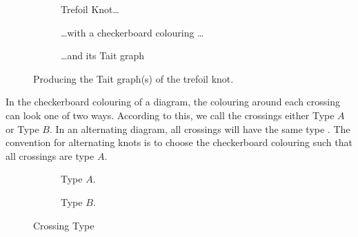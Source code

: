 \documentclass[12pt]{report}
\theoremstyle{upright}
\begin{document}
\begin{figure}[hbt]
	\centering
	\hspace*{\fill}
	\begin{subfigure}[b]{0.3 \textwidth}
		\centering
		\def\svgscale{0.2}
		
		\caption{Trefoil Knot\dots}
		\label{fig:trefoil-blank}
	\end{subfigure}
	\hspace*{\fill}
	\begin{subfigure}[b]{0.3 \textwidth}
		\centering
		\def\svgscale{0.2}
		
		\caption{\dots with a checkerboard colouring \dots}
		\label{fig:trefoil-checker}
	\end{subfigure}
	\hspace*{\fill}
	\begin{subfigure}[b]{0.3 \textwidth}
		\centering
		\def\svgscale{0.2}
		
		\caption{\dots and its Tait graph}
		\label{fig:trefoil-checker-tait}
	\end{subfigure}
	\hspace*{\fill}
	\caption{Producing the Tait graph(s) of the trefoil knot.}
	\label{fig:tait-example}
\end{figure}


In the checkerboard colouring of a diagram, the colouring around each crossing can look one of two ways. According to this, we call the crossings either Type $A$ or Type $B$. In an alternating diagram, all crossings will have the same type \cite[300]{spanning-tree-expansion-jones-polynomial}. The convention for alternating knots is to choose the checkerboard colouring such that all crossings are type $A$.

\begin{figure}[hbt]
	\centering
	\hspace*{\fill}
	\begin{subfigure}[b]{0.4 \textwidth}
		\centering
		\def\svgscale{0.28}
		
		\caption{Type $A$.}
		\label{fig:type-a}
	\end{subfigure}
	\hspace*{\fill} \hspace*{\fill}	\hspace*{\fill}
	\begin{subfigure}[b]{0.4 \textwidth}
		\centering
		\def\svgscale{0.28}
		
		\caption{Type $B$.}
		\label{fig:type-b}
	\end{subfigure}
	\hspace*{\fill} 
	\caption{Crossing Type}
	\label{fig:crossing-type}
\end{figure}
\end{document}
